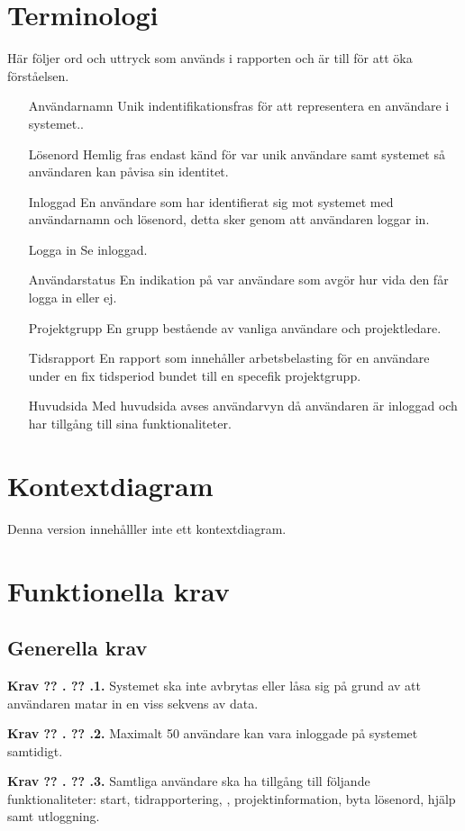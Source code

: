 \documentclass[a4paper]{article}
\newcommand\getcurrentref[1]{%
 \ifnumequal{\value{#1}}{0}
  {??}
  {\the\value{#1}}%
}
\newcommand\requirement[2]{
	\numberedrow{Krav}{#1}{#2}
}
\newcommand\numberedrow[3]{
	\noindent
	\textbf{#1 \getcurrentref{section}.\getcurrentref{subsection}.#2.} #3
	
}
\begin{document}
\section{Terminologi}
Här följer ord och uttryck som används i rapporten och är till för att öka förståelsen.
\begin{itemize}
\item [Användarnamn] Unik indentifikationsfras för att representera en användare i systemet..
\item [Lösenord] Hemlig fras endast känd för var unik användare samt systemet så användaren kan påvisa sin identitet.
\item [Inloggad] En användare som har identifierat sig mot systemet med användarnamn och lösenord, detta sker genom att användaren loggar in.
\item [Logga in] Se inloggad.
\item [Användarstatus] En indikation på var användare som avgör hur vida den får logga in eller ej.
\item [Projektgrupp] En grupp bestående av vanliga användare och projektledare.
\item [Tidsrapport] En rapport som innehåller arbetsbelasting för en användare under en fix tidsperiod bundet till en specefik projektgrupp.
\item [Huvudsida] Med huvudsida avses användarvyn då användaren är inloggad och har tillgång till sina funktionaliteter.
\end{itemize}
\section{Kontextdiagram}
Denna version innehålller inte ett kontextdiagram.
\section{Funktionella krav}
\subsection{Generella krav}
\label{krav-funk-gen}

 \requirement{1}{Systemet ska inte avbrytas eller låsa sig på grund av att användaren matar in en viss sekvens av data.}
\requirement{2}{Maximalt 50 användare kan vara inloggade på systemet samtidigt.}
\requirement{3}{Samtliga användare ska ha tillgång till följande funktionaliteter: start, tidrapportering, , projektinformation, byta lösenord, hjälp samt utloggning.}
\end{document}
